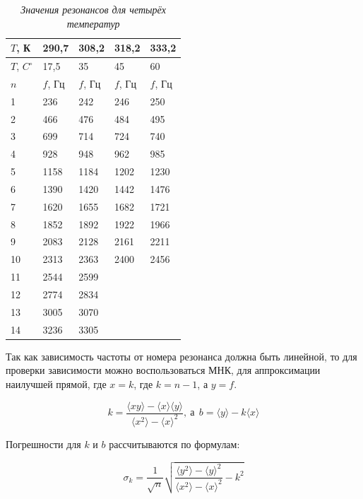\documentclass[a4paper,12pt]{article}
\begin{document}
\begin{table}[!ht]
    \centering
    \begin{tabular}{|l|l|l|l|l|}
    \hline
        $T$, К & 290,7 & 308,2 & 318,2 & 333,2 \\ \hline
        $T$, $C^\circ$ & 17,5 & 35 & 45 & 60 \\ \hline
        $n$ & $f$, Гц & $f$, Гц & $f$, Гц & $f$, Гц \\ \hline
        1 & 236 & 242 & 246 & 250 \\ \hline
        2 & 466 & 476 & 484 & 495 \\ \hline
        3 & 699 & 714 & 724 & 740 \\ \hline
        4 & 928 & 948 & 962 & 985 \\ \hline
        5 & 1158 & 1184 & 1202 & 1230 \\ \hline
        6 & 1390 & 1420 & 1442 & 1476 \\ \hline
        7 & 1620 & 1655 & 1682 & 1721 \\ \hline
        8 & 1852 & 1892 & 1922 & 1966 \\ \hline
        9 & 2083 & 2128 & 2161 & 2211 \\ \hline
        10 & 2313 & 2363 & 2400 & 2456 \\ \hline
        11 & 2544 & 2599 & ~ & ~ \\ \hline
        12 & 2774 & 2834 & ~ & ~ \\ \hline
        13 & 3005 & 3070 & ~ & ~ \\ \hline
        14 & 3236 & 3305 & ~ & ~ \\ \hline
    \end{tabular}\caption{\textit{Значения резонансов для четырёх температур}}\label{table:resonance-1}
\end{table}

Так как зависимость частоты от номера резонанса должна быть линейной, то для проверки зависимости можно воспользоваться МНК, для аппроксимации наилучшей прямой, где $x = k$, где $k = n - 1$, а $y = f$.

\begin{equation}\label{eq:mnk}
    k = \frac{\langle xy\rangle - \langle x \rangle \langle y \rangle}{\langle x^2 \rangle - \langle x \rangle^2},
    \ \text{а} \ \  b = \langle y \rangle - k\langle x \rangle
\end{equation}

Погрешности для $k$ и $b$ рассчитываются по формулам:

\begin{equation}
    \sigma_k = \frac{1}{\sqrt{n}} \sqrt{\frac{\langle y^2 \rangle - \langle y \rangle^2}{\langle x^2 \rangle - \langle x \rangle^2} - k^2}
\end{equation}
\end{document}
